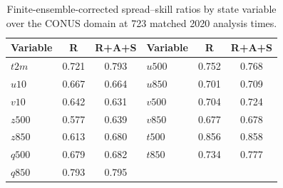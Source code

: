 \begin{table}[!htbp]
    \centering
    \caption{Finite-ensemble-corrected spread--skill ratios by state variable
    over the CONUS domain at 723 matched 2020 analysis times.}
    \label{tab:spread_skill_variable}
    \small
    \renewcommand{\arraystretch}{1.08}
    \begin{tabular*}{\textwidth}{@{\extracolsep{\fill}}lcclcc@{}}
        \toprule
        Variable & R & R+A+S & Variable & R & R+A+S \\
        \midrule
        $t2m$  & 0.721 & 0.793 & $u500$ & 0.752 & 0.768 \\
        $u10$  & 0.667 & 0.664 & $u850$ & 0.701 & 0.709 \\
        $v10$  & 0.642 & 0.631 & $v500$ & 0.704 & 0.724 \\
        $z500$ & 0.577 & 0.639 & $v850$ & 0.677 & 0.678 \\
        $z850$ & 0.613 & 0.680 & $t500$ & 0.856 & 0.858 \\
        $q500$ & 0.679 & 0.682 & $t850$ & 0.734 & 0.777 \\
        $q850$ & 0.793 & 0.795 & & & \\
        \bottomrule
    \end{tabular*}
\end{table}
